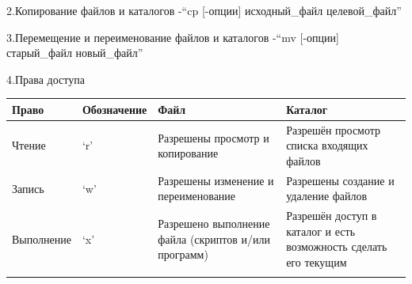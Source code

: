 \documentclass[
  ignorenonframetext,
  aspectratio=169,
  russian,
]{beamer}
\begin{document}
\begin{frame}{2.Копирование файлов и каталогов}
\label{ux43aux43eux43fux438ux440ux43eux432ux430ux43dux438ux435-ux444ux430ux439ux43bux43eux432-ux438-ux43aux430ux442ux430ux43bux43eux433ux43eux432}
-\enquote{cp {[}-опции{]} исходный\_файл целевой\_файл}
\end{frame}

\begin{frame}{3.Перемещение и переименование файлов и каталогов}
\label{ux43fux435ux440ux435ux43cux435ux449ux435ux43dux438ux435-ux438-ux43fux435ux440ux435ux438ux43cux435ux43dux43eux432ux430ux43dux438ux435-ux444ux430ux439ux43bux43eux432-ux438-ux43aux430ux442ux430ux43bux43eux433ux43eux432}
-\enquote{mv {[}-опции{]} старый\_файл новый\_файл}
\end{frame}

\begin{frame}{4.Права доступа}
\label{ux43fux440ux430ux432ux430-ux434ux43eux441ux442ux443ux43fux430}
\begin{longtable}[]{@{}
  >{\raggedright\arraybackslash}p{}
  >{\raggedright\arraybackslash}p{}
  >{\raggedright\arraybackslash}p{}
  >{\raggedright\arraybackslash}p{}@{}}
\toprule\noalign{}
\begin{minipage}[b]{\linewidth}\raggedright
Право
\end{minipage} & \begin{minipage}[b]{\linewidth}\raggedright
Обозначение
\end{minipage} & \begin{minipage}[b]{\linewidth}\raggedright
Файл
\end{minipage} & \begin{minipage}[b]{\linewidth}\raggedright
Каталог
\end{minipage} \\
\midrule\noalign{}
\endhead
Чтение & \enquote*{r} & Разрешены просмотр и копирование & Разрешён
просмотр списка входящих файлов \\
Запись & \enquote*{w} & Разрешены изменение и переименование & Разрешены
создание и удаление файлов \\
Выполнение & \enquote*{x} & Разрешено выполнение файла (скриптов и/или
программ) & Разрешён доступ в каталог и есть возможность сделать его
текущим \\
\bottomrule\noalign{}
\end{longtable}
\end{frame}
\end{document}
